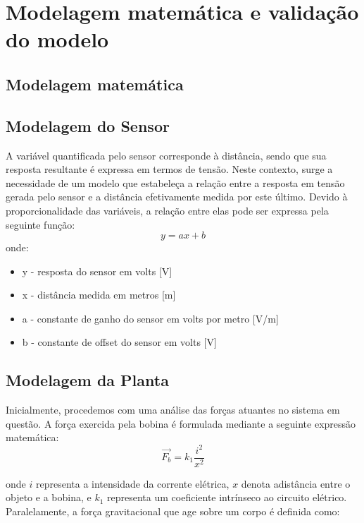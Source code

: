 \documentclass{ifacconf}
\begin{document}
\section{Modelagem matemática e validação do modelo}



\subsection{Modelagem matemática}

\subsection{Modelagem do Sensor}

A variável quantificada pelo sensor corresponde à distância,
sendo que sua resposta resultante é expressa em termos de tensão.
Neste contexto, surge a necessidade de um modelo que estabeleça a
relação entre a resposta em tensão gerada pelo sensor e a distância
efetivamente medida por este último. Devido à proporcionalidade
das variáveis, a relação entre elas pode ser expressa pela seguinte
função:
\begin{equation}
    y = ax + b
\end{equation}
onde:
\begin{itemize}
    \item y - resposta do sensor em volts [V]
    \item x - distância medida em metros [m]
    \item a - constante de ganho do sensor em volts por metro [V/m]
    \item b - constante de offset do sensor em volts [V]
\end{itemize}

\subsection{Modelagem da Planta}

Inicialmente, procedemos com uma análise das forças atuantes
no sistema em questão. A força exercida pela bobina é formulada
mediante a seguinte expressão matemática:
\begin{equation}
    \vec{F_b} = k_1 \frac{i^2}{x^2}
\end{equation}

\noindent onde $i$ representa a intensidade da corrente elétrica, $x$ denota adistância entre o objeto e a bobina, e $k_1$ representa um coeficiente intrínseco ao circuito elétrico. Paralelamente, a força gravitacional que age sobre um corpo é definida como:
\end{document}
